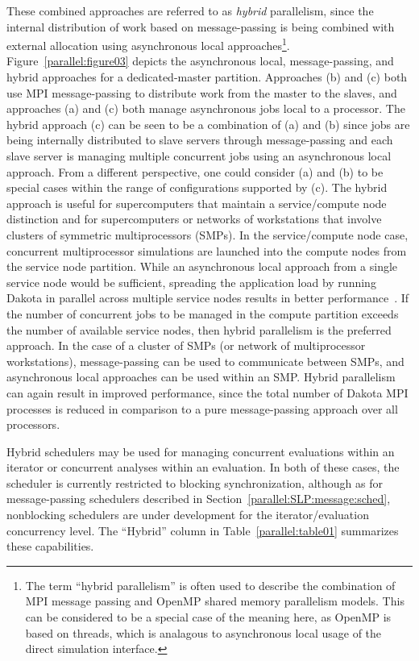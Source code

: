 These combined approaches are referred to as \emph{hybrid}
parallelism, since the internal distribution of work based on
message-passing is being combined with external allocation using
asynchronous local approaches\footnote{The term ``hybrid parallelism''
is often used to describe the combination of MPI message passing and
OpenMP shared memory parallelism models.  This can be considered to be
a special case of the meaning here, as OpenMP is based on threads,
which is analagous to asynchronous local usage of the direct
simulation interface.}.  Figure~\ref{parallel:figure03} depicts the
asynchronous local, message-passing, and hybrid approaches for a
dedicated-master partition. Approaches (b) and (c) both use MPI
message-passing to distribute work from the master to the slaves, and
approaches (a) and (c) both manage asynchronous jobs local to a
processor. The hybrid approach (c) can be seen to be a combination of
(a) and (b) since jobs are being internally distributed to slave
servers through message-passing and each slave server is managing
multiple concurrent jobs using an asynchronous local approach. From a
different perspective, one could consider (a) and (b) to be special
cases within the range of configurations supported by (c). The hybrid
approach is useful for supercomputers that maintain a service/compute
node distinction and for supercomputers or networks of workstations
that involve clusters of symmetric multiprocessors (SMPs). In the
service/compute node case, concurrent multiprocessor simulations are
launched into the compute nodes from the service node partition. While
an asynchronous local approach from a single service node would be
sufficient, spreading the application load by running Dakota in
parallel across multiple service nodes results in better
performance~\cite{Eld00}. If the number of concurrent jobs to be
managed in the compute partition exceeds the number of available
service nodes, then hybrid parallelism is the preferred approach. In
the case of a cluster of SMPs (or network of multiprocessor
workstations), message-passing can be used to communicate between
SMPs, and asynchronous local approaches can be used within an
SMP. Hybrid parallelism can again result in improved performance,
since the total number of Dakota MPI processes is reduced in
comparison to a pure message-passing approach over all processors.

Hybrid schedulers may be used for managing concurrent evaluations
within an iterator or concurrent analyses within an evaluation.  In
both of these cases, the scheduler is currently restricted to blocking
synchronization, although as for message-passing schedulers described
in Section~\ref{parallel:SLP:message:sched}, nonblocking schedulers
are under development for the iterator/evaluation concurrency level.
The ``Hybrid'' column in Table~\ref{parallel:table01} summarizes these
capabilities.

